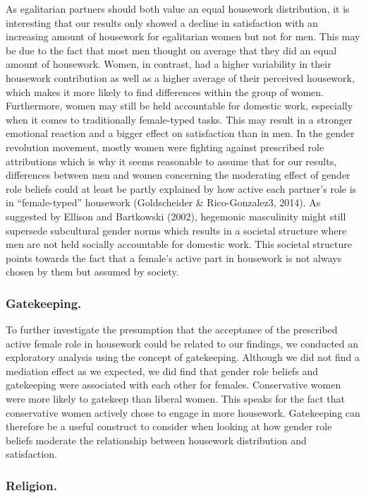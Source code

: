 \documentclass[
  man,floatsintext]{apa6}
\begin{document}
As egalitarian partners should both value an equal housework distribution, it is interesting that our results only showed a decline in satisfaction with an increasing amount of housework for egalitarian women but not for men. This may be due to the fact that most men thought on average that they did an equal amount of housework. Women, in contrast, had a higher variability in their housework contribution as well as a higher average of their perceived housework, which makes it more likely to find differences within the group of women. Furthermore, women may still be held accountable for domestic work, especially when it comes to traditionally female-typed tasks. This may result in a stronger emotional reaction and a bigger effect on satisfaction than in men. In the gender revolution movement, mostly women were fighting against prescribed role attributions which is why it seems reasonable to assume that for our results, differences between men and women concerning the moderating effect of gender role beliefs could at least be partly explained by how active each partner's role is in ``female-typed'' housework (Goldscheider \& Rico-Gonzalez3, 2014). As suggested by Ellison and Bartkowski (2002), hegemonic masculinity might still supersede subcultural gender norms which results in a societal structure where men are not held socially accountable for domestic work. This societal structure points towards the fact that a female's active part in housework is not always chosen by them but assumed by society.

\hypertarget{gatekeeping.}{%
\subsubsection{Gatekeeping.}\label{gatekeeping.}}

To further investigate the presumption that the acceptance of the prescribed active female role in housework could be related to our findings, we conducted an exploratory analysis using the concept of gatekeeping. Although we did not find a mediation effect as we expected, we did find that gender role beliefs and gatekeeping were associated with each other for females. Conservative women were more likely to gatekeep than liberal women. This speaks for the fact that conservative women actively chose to engage in more housework. Gatekeeping can therefore be a useful construct to consider when looking at how gender role beliefs moderate the relationship between housework distribution and satisfaction.

\hypertarget{religion.}{%
\subsubsection{Religion.}\label{religion.}}
\end{document}
